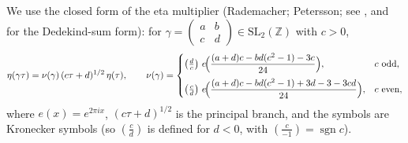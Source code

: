 \documentclass[11pt,a4paper]{article}
\numberwithin{equation}{section}
\theoremstyle{definition}
\theoremstyle{remark}
\newcommand{\Z}{\mathbb Z}
\newcommand{\leg}[2]{\left(\frac{#1}{#2}\right)}
\begin{document}
We use the closed form of the eta multiplier (Rademacher; Petersson; see
\citealp[Ch.~4, \S4.1]{Knopp70}, and \citealp[Thm.~3.4]{Apostol90} for the Dedekind-sum form):
for $\gamma=\begin{pmatrix}a&b\\c&d\end{pmatrix}\in\mathrm{SL}_2(\Z)$ with $c>0$,
\begingroup\small
\begin{equation}\label{eq:petersson}
\eta(\gamma\tau)=\nu(\gamma)\,(c\tau+d)^{1/2}\,\eta(\tau),\qquad
\nu(\gamma)=
\begin{cases}
\leg{d}{c}\,e\!\Bigl(\dfrac{(a+d)c-bd(c^2-1)-3c}{24}\Bigr), & c\ \text{odd},\\[2ex]
\leg{c}{d}\,e\!\Bigl(\dfrac{(a+d)c-bd(c^2-1)+3d-3-3cd}{24}\Bigr), & c\ \text{even},
\end{cases}
\end{equation}
\endgroup
where $e(x)=e^{2\pi ix}$, $(c\tau+d)^{1/2}$ is the principal branch, and the symbols are Kronecker
symbols (so $\leg{c}{d}$ is defined for $d<0$, with $\leg{c}{-1}=\operatorname{sgn}c$). 
\end{document}
